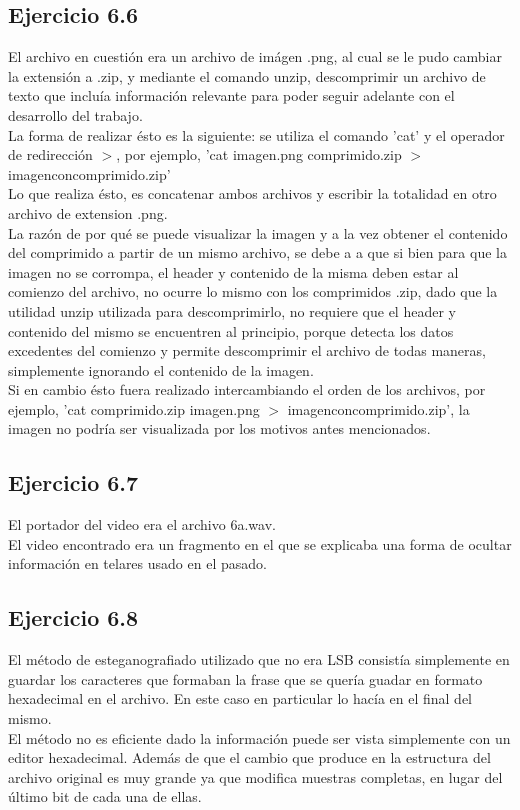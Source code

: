 \documentclass{article}
\begin{document}
\subsection{Ejercicio 6.6}
\noindent El archivo en cuestión era un archivo de imágen .png, al cual se le pudo cambiar la extensión a .zip, y mediante el comando unzip, descomprimir un archivo de texto que incluía información relevante para poder seguir adelante con el desarrollo del trabajo.\\
La forma de realizar ésto es la siguiente: se utiliza el comando 'cat' y el operador de redirección $>$, por ejemplo, 'cat imagen.png comprimido.zip $>$ imagenconcomprimido.zip'\\
\noindent Lo que realiza ésto, es concatenar ambos archivos y escribir la totalidad en otro archivo de extension .png. \\
\noindent La razón de por qué se puede visualizar la imagen y a la vez obtener el contenido del comprimido a partir de un mismo archivo, se debe a a que si bien para que la imagen no se corrompa, el header y contenido de la misma deben estar al comienzo del archivo, no ocurre lo mismo con los comprimidos .zip, dado que la utilidad unzip utilizada para descomprimirlo, no requiere que el header y contenido del mismo se encuentren al principio, porque detecta los datos excedentes del comienzo y permite descomprimir el archivo de todas maneras, simplemente ignorando el contenido de la imagen.\\
\noindent Si en cambio ésto fuera realizado intercambiando el orden de los archivos, por ejemplo, 'cat comprimido.zip imagen.png $>$ imagenconcomprimido.zip', la imagen no podría ser visualizada por los motivos antes mencionados.

\subsection{Ejercicio 6.7}

\noindent El portador del video era el archivo 6a.wav. \\ El video encontrado era un fragmento en el que se explicaba una forma de ocultar información en telares usado en el pasado.

\subsection{Ejercicio 6.8}

\noindent El método de esteganografiado utilizado que no era LSB consistía simplemente en guardar los caracteres que formaban la frase que se quería guadar en formato hexadecimal en el archivo. En este caso en particular lo hacía en el final del mismo.\\
El método no es eficiente dado la información puede ser vista simplemente con un editor hexadecimal. Además de que el cambio que produce en la estructura del archivo original es muy grande ya que modifica muestras completas, en lugar del último bit de cada una de ellas.\\
\end{document}

